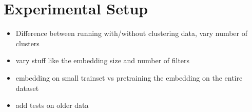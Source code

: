 \chapter{Experimental Setup}
\begin{itemize}
  \item Difference between running with/without clustering data, vary number of clusters
  \item vary stuff like the embedding size and number of filters
  \item embedding on small trainset vs pretraining the embedding on the entire dataset
  \item add tests on older data
\end{itemize}

